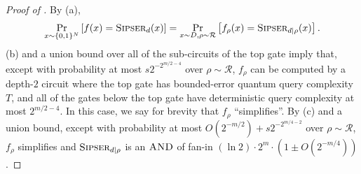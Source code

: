 \documentclass[10pt,a4paper]{article}
\newcommand{\Sipser}{\normalfont\textsc{Sipser}}
\newcommand{\AND}{\normalfont\textsc{AND}} %
\begin{document}
\begin{proof}[Proof of ]
By (a),
\[
\Pr_{x \sim \{0,1\}^N}\left[f(x) = \Sipser_d(x)\right]
= \Pr_{x \sim D, \rho \sim \mathcal{R}}\left[f_\rho(x) = \Sipser_{d|\rho} (x)\right].
\]
(b) and a union bound over all of the sub-circuits of the top gate imply that, except with probability at most $s2^{-2^{m/2 - 4}}$ over $\rho \sim \mathcal{R}$, $f_\rho$ can be computed by a depth-$2$ circuit where the top gate has bounded-error quantum query complexity $T$, and all of the gates below the top gate have deterministic query complexity at most $2^{m/2-4}$. In this case, we say for brevity that $f_\rho$ ``simplifies''. By (c) and a union bound, except with probability at most $O\left(2^{-m/2}\right) + s2^{-2^{m/4 - 2}}$ over $\rho \sim \mathcal{R}$, $f_\rho$ simplifies and $\Sipser_{d|\rho}$ is an $\AND$ of fan-in $(\ln 2) \cdot 2^m \cdot \left(1 \pm O\left(2^{-m/4}\right)\right)$.


\end{proof}
\end{document}
